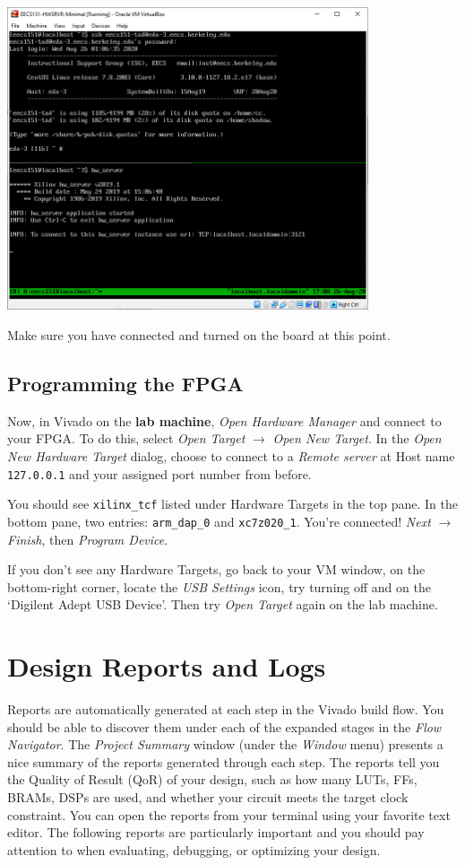 \documentclass[11pt]{article}
\begin{document}
\begin{center}
\includegraphics[width=0.8\textwidth]{figs/hwsrvr_vm.png}
\end{center}

Make sure you have connected and turned on the board at this point.

\subsection{Programming the FPGA}
Now, in Vivado on the \textbf{lab machine}, \emph{Open Hardware Manager} and connect to your FPGA. 
To do this, select \emph{Open Target} $\rightarrow$ \emph{Open New Target}. 
In the \emph{Open New Hardware Target} dialog, choose to connect to a \emph{Remote server} at Host name \texttt{127.0.0.1} and your assigned port number from before.

You should see \verb|xilinx_tcf| listed under Hardware Targets in the top pane. In the bottom pane, two entries: \verb|arm_dap_0| and \verb|xc7z020_1|. You're connected! \emph{Next} $\rightarrow$ \emph{Finish}, then \emph{Program Device}.

If you don't see any Hardware Targets, go back to your VM window, on the bottom-right corner, locate the \emph{USB Settings} icon, try turning off and on the `Digilent Adept USB Device'. Then try \emph{Open Target} again on the lab machine.

\section{Design Reports and Logs}

Reports are automatically generated at each step in the Vivado build flow. You should be able to discover them under each of the expanded stages in the \emph{Flow Navigator}. The \emph{Project Summary} window (under the \emph{Window} menu) presents a nice summary of the reports generated through each step. The reports tell you the Quality of Result (QoR) of your design, such as how many LUTs, FFs, BRAMs, DSPs are used, and whether your circuit meets the target clock constraint. 
You can open the reports from your terminal using your favorite text editor. The following reports are particularly important and you should pay attention to when evaluating, debugging, or optimizing your design.
\end{document}
